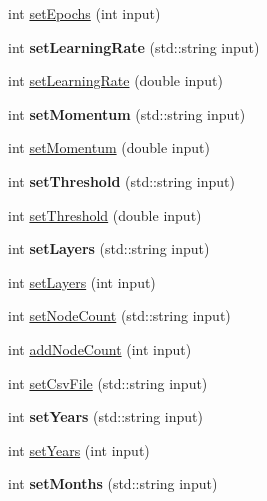 \begin{DoxyCompactItemize}
\item 
int \hyperlink{classPrm_a4e65839379f64c5a71531d6bc6043da8}{set\-Epochs} (int input)
\item 
\hypertarget{classPrm_adee3e98a27ba672b56cf147e22b53b0a}{int {\bfseries set\-Learning\-Rate} (std\-::string input)}\label{classPrm_adee3e98a27ba672b56cf147e22b53b0a}

\item 
int \hyperlink{classPrm_a676a70cadee346c59f3fd790c000263d}{set\-Learning\-Rate} (double input)
\item 
\hypertarget{classPrm_a3b496d6e52ac396ee3652251371b6305}{int {\bfseries set\-Momentum} (std\-::string input)}\label{classPrm_a3b496d6e52ac396ee3652251371b6305}

\item 
int \hyperlink{classPrm_a4d6ffa8322e888a592d6cf149d7a73df}{set\-Momentum} (double input)
\item 
\hypertarget{classPrm_ace4ec4db705065a331c9fe1ded36e197}{int {\bfseries set\-Threshold} (std\-::string input)}\label{classPrm_ace4ec4db705065a331c9fe1ded36e197}

\item 
int \hyperlink{classPrm_a802b567543283a866ce9f9177b9d725e}{set\-Threshold} (double input)
\item 
\hypertarget{classPrm_a5c4163627479d63ce202f6f5bc8c5edc}{int {\bfseries set\-Layers} (std\-::string input)}\label{classPrm_a5c4163627479d63ce202f6f5bc8c5edc}

\item 
int \hyperlink{classPrm_a3b9a3b3ea639f0a38234206c6b040b0e}{set\-Layers} (int input)
\item 
int \hyperlink{classPrm_ae2998ee2505eff631dbb26551525dda2}{set\-Node\-Count} (std\-::string input)
\item 
int \hyperlink{classPrm_a196747661602512cc39eb7e3ba7dfeb6}{add\-Node\-Count} (int input)
\item 
int \hyperlink{classPrm_a82870753dbe90068a555a8f016ccea06}{set\-Csv\-File} (std\-::string input)
\item 
\hypertarget{classPrm_af1337d5da80b35f497c2b413603c86b9}{int {\bfseries set\-Years} (std\-::string input)}\label{classPrm_af1337d5da80b35f497c2b413603c86b9}

\item 
int \hyperlink{classPrm_a8a20f075801876d1c53dc2e68990426e}{set\-Years} (int input)
\item 
\hypertarget{classPrm_ae68fb0b77de17945cf24ffea1e5f9f0d}{int {\bfseries set\-Months} (std\-::string input)}\label{classPrm_ae68fb0b77de17945cf24ffea1e5f9f0d}


\end{DoxyCompactItemize}
